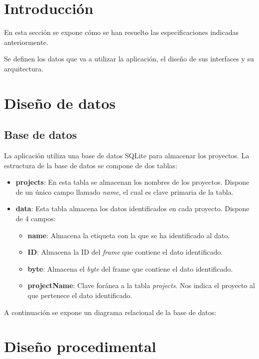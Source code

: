 
\section{Introducción}

En esta sección se expone cómo se han resuelto las especificaciones indicadas anteriormente.

Se definen los datos que va a utilizar la aplicación, el diseño de sus interfaces y su arquitectura.

\section{Diseño de datos}

\subsection{Base de datos}

La aplicación utiliza una base de datos SQLite para almacenar los proyectos. La estructura de la base de datos se compone de dos tablas:

\begin{itemize}
\item
\textbf{projects}: En esta tabla se almacenan los nombres de los proyectos. Dispone de un único campo llamado \emph{name}, el cual es clave primaria de la tabla.
\item
\textbf{data}: Esta tabla almacena los datos identificados en cada proyecto. Dispone de 4 campos:
\begin{itemize}
\item
\textbf{name}: Almacena la etiqueta con la que se ha identificado al dato.
\item
\textbf{ID}: Almacena la ID del \emph{frame} que contiene el dato identificado.
\item
\textbf{byte}: Almacena el \emph{byte} del frame que contiene el dato identificado.
\item
\textbf{projectName}: Clave foránea a la tabla \emph{projects}. Nos indica el proyecto al que pertenece el dato identificado.
\end{itemize}
\end{itemize}

A continuación se expone un diagrama relacional de la base de datos:

\newpage
\section{Diseño procedimental}

